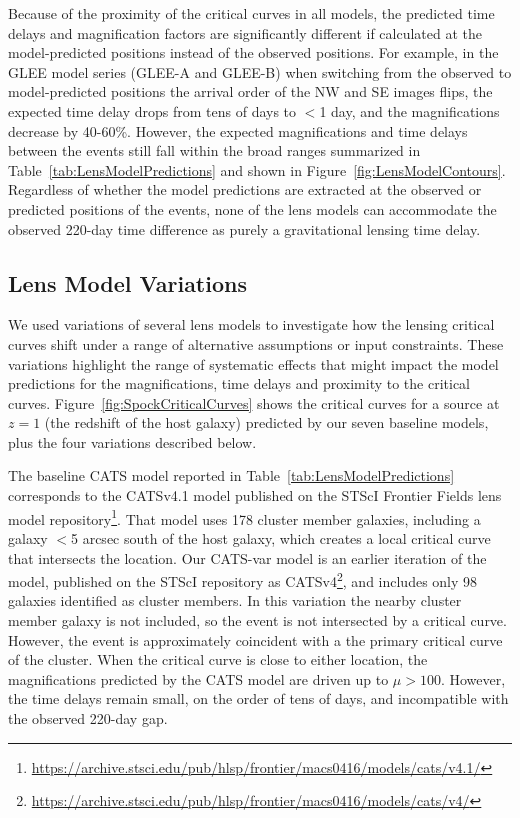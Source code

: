 Because of the proximity of the critical curves in all models, the
predicted time delays and magnification factors are significantly
different if calculated at the model-predicted positions instead of
the observed positions.  For example, in the GLEE model series (GLEE-A
and GLEE-B) when switching from the observed to model-predicted
positions the arrival order of the NW and SE images flips, the
expected time delay drops from tens of days to $<$1 day, and the
magnifications decrease by 40-60\%.  However, the expected
magnifications and time delays between the events still fall within
the broad ranges summarized in Table~\ref{tab:LensModelPredictions}
and shown in Figure~\ref{fig:LensModelContours}.  Regardless of
whether the model predictions are extracted at the observed or
predicted positions of the \spock events, none of the lens models can
accommodate the observed 220-day time difference as purely a
gravitational lensing time delay.



\subsection{Lens Model Variations}\label{sec:LensModelVariations}

We used variations of several lens models to investigate how the
lensing critical curves shift under a range of alternative assumptions
or input constraints.  These variations highlight the range of
systematic effects that might impact the model predictions for the
\spock magnifications, time delays and proximity to the critical
curves.  Figure~\ref{fig:SpockCriticalCurves} shows the critical
curves for a source at $z=1$ (the redshift of the \spock host galaxy)
predicted by our seven baseline models, plus the four variations
described below.

The baseline CATS model reported in
Table~\ref{tab:LensModelPredictions} corresponds to the CATSv4.1 model
published on the STScI Frontier Fields lens model
repository\footnote{\url{https://archive.stsci.edu/pub/hlsp/frontier/macs0416/models/cats/v4.1/}}.
That model uses 178 cluster member galaxies, including a galaxy $<$5
arcsec south of the \spock host galaxy, which creates a local critical
curve that intersects the \spocktwo location.  Our CATS-var model is
an earlier iteration of the model, published on the STScI repository
as
CATSv4\footnote{\url{https://archive.stsci.edu/pub/hlsp/frontier/macs0416/models/cats/v4/}},
and includes only 98 galaxies identified as cluster members.  In this
variation the nearby cluster member galaxy is not included, so the
\spocktwo event is not intersected by a critical curve. However, the
\spockone event is approximately coincident with a the primary
critical curve of the  cluster.  When the critical curve is
close to either \spock location, the magnifications predicted by the
CATS model are driven up to $\mu>100$.  However, the time delays
remain small, on the order of tens of days, and incompatible with the
observed 220-day gap.

